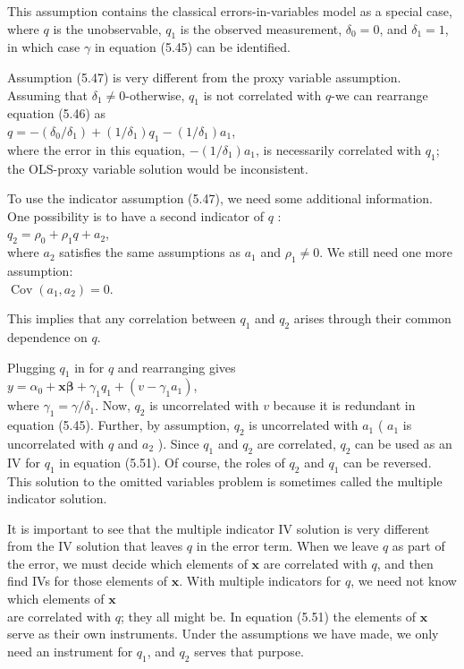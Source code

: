 \documentclass[10pt]{article}
\begin{document}
This assumption contains the classical errors-in-variables model as a special case, where $q$ is the unobservable, $q_{1}$ is the observed measurement, $\delta_{0}=0$, and $\delta_{1}=1$, in which case $\gamma$ in equation (5.45) can be identified.

Assumption (5.47) is very different from the proxy variable assumption. Assuming that $\delta_{1} \neq 0$-otherwise, $q_{1}$ is not correlated with $q$-we can rearrange equation (5.46) as\\
$q=-\left(\delta_{0} / \delta_{1}\right)+\left(1 / \delta_{1}\right) q_{1}-\left(1 / \delta_{1}\right) a_{1}$,\\
where the error in this equation, $-\left(1 / \delta_{1}\right) a_{1}$, is necessarily correlated with $q_{1}$; the OLS-proxy variable solution would be inconsistent.

To use the indicator assumption (5.47), we need some additional information. One possibility is to have a second indicator of $q$ :\\
$q_{2}=\rho_{0}+\rho_{1} q+a_{2}$,\\
where $a_{2}$ satisfies the same assumptions as $a_{1}$ and $\rho_{1} \neq 0$. We still need one more assumption:\\
$\operatorname{Cov}\left(a_{1}, a_{2}\right)=0$.

This implies that any correlation between $q_{1}$ and $q_{2}$ arises through their common dependence on $q$.

Plugging $q_{1}$ in for $q$ and rearranging gives\\
$y=\alpha_{0}+\mathbf{x} \boldsymbol{\beta}+\gamma_{1} q_{1}+\left(v-\gamma_{1} a_{1}\right)$,\\
where $\gamma_{1}=\gamma / \delta_{1}$. Now, $q_{2}$ is uncorrelated with $v$ because it is redundant in equation (5.45). Further, by assumption, $q_{2}$ is uncorrelated with $a_{1}$ ( $a_{1}$ is uncorrelated with $q$ and $a_{2}$ ). Since $q_{1}$ and $q_{2}$ are correlated, $q_{2}$ can be used as an IV for $q_{1}$ in equation (5.51). Of course, the roles of $q_{2}$ and $q_{1}$ can be reversed. This solution to the omitted variables problem is sometimes called the multiple indicator solution.

It is important to see that the multiple indicator IV solution is very different from the IV solution that leaves $q$ in the error term. When we leave $q$ as part of the error, we must decide which elements of $\mathbf{x}$ are correlated with $q$, and then find IVs for those elements of $\mathbf{x}$. With multiple indicators for $q$, we need not know which elements of $\mathbf{x}$\\
are correlated with $q$; they all might be. In equation (5.51) the elements of $\mathbf{x}$ serve as their own instruments. Under the assumptions we have made, we only need an instrument for $q_{1}$, and $q_{2}$ serves that purpose.
\end{document}
